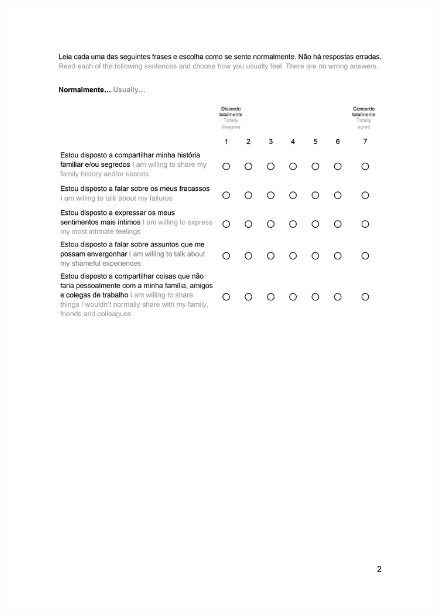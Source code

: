 \begin{figure}[h!]
\centering
\includegraphics[width=\textwidth]{figures/02_02.jpg}
\end{figure}

\clearpage
